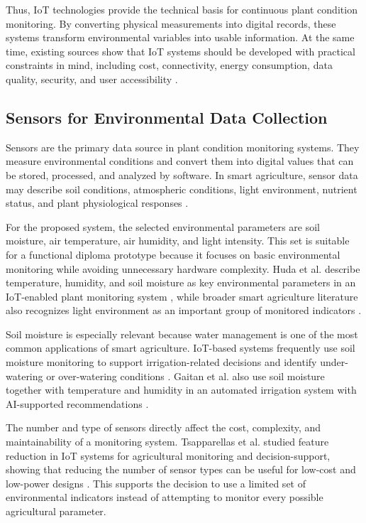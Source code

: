 Thus, IoT technologies provide the technical basis for continuous plant condition monitoring. By converting physical measurements into digital records, these systems transform environmental variables into usable information. At the same time, existing sources show that IoT systems should be developed with practical constraints in mind, including cost, connectivity, energy consumption, data quality, security, and user accessibility \cite{miller2025iot,nawaz2025iot}.

\subsection{Sensors for Environmental Data Collection}

Sensors are the primary data source in plant condition monitoring systems. They measure environmental conditions and convert them into digital values that can be stored, processed, and analyzed by software. In smart agriculture, sensor data may describe soil conditions, atmospheric conditions, light environment, nutrient status, and plant physiological responses \cite{huda2024iot,mowla2023iot,reza2025trends}.

For the proposed system, the selected environmental parameters are soil moisture, air temperature, air humidity, and light intensity. This set is suitable for a functional diploma prototype because it focuses on basic environmental monitoring while avoiding unnecessary hardware complexity. Huda et al. describe temperature, humidity, and soil moisture as key environmental parameters in an IoT-enabled plant monitoring system \cite{huda2024iot}, while broader smart agriculture literature also recognizes light environment as an important group of monitored indicators \cite{mowla2023iot}.

Soil moisture is especially relevant because water management is one of the most common applications of smart agriculture. IoT-based systems frequently use soil moisture monitoring to support irrigation-related decisions and identify under-watering or over-watering conditions \cite{mowla2023iot,hassan2021systematic}. Gaitan et al. also use soil moisture together with temperature and humidity in an automated irrigation system with AI-supported recommendations \cite{gaitan2025integrating}.

The number and type of sensors directly affect the cost, complexity, and maintainability of a monitoring system. Tsapparellas et al. studied feature reduction in IoT systems for agricultural monitoring and decision-support, showing that reducing the number of sensor types can be useful for low-cost and low-power designs \cite{tsapparellas2020laplacian}. This supports the decision to use a limited set of environmental indicators instead of attempting to monitor every possible agricultural parameter.


